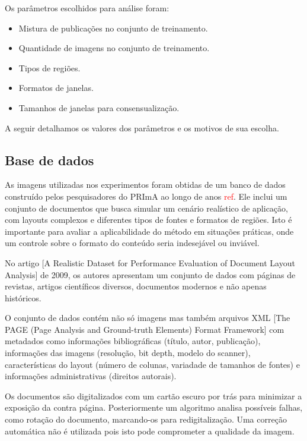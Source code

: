 \documentclass[a4paper,11pt]{article}
\newcommand{\TODO}[1]{\textcolor{red}{#1}}
\begin{document}
  Os parâmetros escolhidos para análise foram:

  \begin{itemize}
    \item Mistura de publicações no conjunto de treinamento.
    \item Quantidade de imagens no conjunto de treinamento.
    \item Tipos de regiões.
    \item Formatos de janelas.
    \item Tamanhos de janelas para consensualização.
  \end{itemize}

  A seguir detalhamos os valores dos parâmetros e os motivos de sua escolha.

  \subsection{Base de dados}

    As imagens utilizadas nos experimentos foram obtidas de um banco de dados construído pelos pesquisadores do PRImA ao longo de anos \TODO{ref}. Ele inclui um conjunto de documentos que busca simular um cenário realístico de aplicação, com layouts complexos e diferentes tipos de fontes e formatos de regiões. Isto é importante para avaliar a aplicabilidade do método em situações práticas, onde um controle sobre o formato do conteúdo seria indesejável ou inviável.

    No artigo [A Realistic Dataset for Performance Evaluation of Document Layout Analysis] de 2009, os autores apresentam um conjunto de dados com páginas de revistas, artigos científicos diversos, documentos modernos e não apenas históricos.

    O conjunto de dados contém não só imagens mas também arquivos XML [The PAGE (Page Analysis and Ground-truth Elements) Format Framework] com metadados como informações bibliográficas (título, autor, publicação), informações das imagens (resolução, bit depth, modelo do scanner), características do layout (número de colunas, variadade de tamanhos de fontes) e informações administrativas (direitos autorais).

    Os documentos são digitalizados com um cartão escuro por trás para minimizar a exposição da contra página. Posteriormente um algoritmo analisa possíveis falhas, como rotação do documento, marcando-os para redigitalização. Uma correção automática não é utilizada pois isto pode comprometer a qualidade da imagem.
\end{document}
